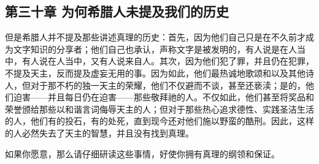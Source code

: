 
\subsection{第三十章 为何希腊人未提及我们的历史}

但是希腊人并不提及那些讲述真理的历史：首先，因为他们自己只是在不久前才成为文字知识的分享者；他们自己也承认，声称文字是被发明的，有人说是在人当中，有人说在人当中，又有人说来自人。其次，因为他们犯了罪，并且仍在犯罪，不提及天主，反而提及虚妄无用的事。因为如此，他们最热诚地歌颂和以及其他诗人，但对于那不朽的独一天主的荣耀，他们不仅避而不谈，甚至还亵渎；是的，他们迫害——并且每日仍在迫害——那些敬拜祂的人。不仅如此，他们甚至将奖品和荣誉颁给那些以和谐言词侮辱天主的人；但对于那些热心追求德性、实践圣洁生活的人，他们有的投石，有的处死，直到现今还对他们施以野蛮的酷刑。因此，这样的人必然失去了天主的智慧，并且没有找到真理。\par

如果你愿意，那么请仔细研读这些事情，好使你拥有真理的纲领和保证。\par

